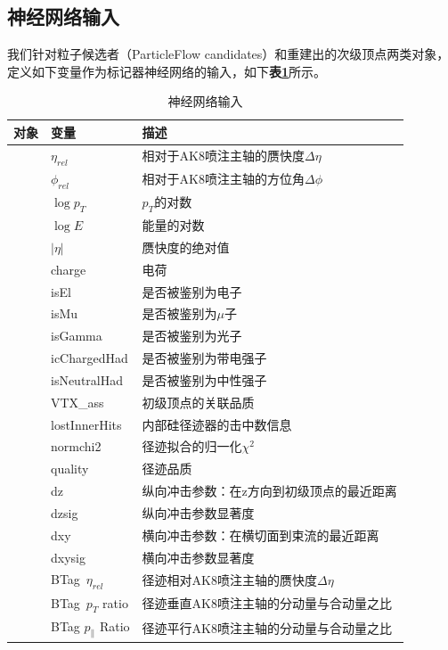 \subsection{神经网络输入}
我们针对粒子候选者（ParticleFlow candidates）和重建出的次级顶点两类对象，定义如下变量作为标记器神经网络的输入，如下\textbf{表\ref{table:5.1}}所示。
\begin{table}[htbp]
    \caption{神经网络输入}\label{table:5.1}
    \centering
    \begin{tabular}{>{\centering\arraybackslash}p{2.5cm}%
    >{\centering\arraybackslash}p{3cm}%
    >{\centering\arraybackslash}p{9cm}}
    \toprule\toprule
    \textbf{对象} & \textbf{变量} & \textbf{描述}\\
    \midrule
    \multirow{25}{*}{粒子候选者} & $\eta_{rel}$ & 相对于AK8喷注主轴的赝快度$\Delta \eta$\\
    & $\phi_{rel}$ & 相对于AK8喷注主轴的方位角$\Delta \phi$\\
    & $\log{p_T}$ & $p_T$的对数\\
    & $\log{E}$ & 能量的对数\\
    & $|\eta|$ & 赝快度的绝对值\\
    & charge & 电荷\\
    & isEl & 是否被鉴别为电子\\
    & isMu & 是否被鉴别为$\mu$子\\
    & isGamma & 是否被鉴别为光子\\
    & icChargedHad & 是否被鉴别为带电强子\\
    & isNeutralHad & 是否被鉴别为中性强子\\
    & VTX\_ass & 初级顶点的关联品质\\
    & lostInnerHits & 内部硅径迹器的击中数信息\\
    & normchi2 & 径迹拟合的归一化$\chi^2$\\
    & quality & 径迹品质\\
    & dz & 纵向冲击参数：在z方向到初级顶点的最近距离\\
    & dzsig & 纵向冲击参数显著度\\
    & dxy & 横向冲击参数：在横切面到束流的最近距离\\
    & dxysig & 横向冲击参数显著度\\
    & BTag\ $\eta_{rel}$ & 径迹相对AK8喷注主轴的赝快度$\Delta \eta$\\
    & BTag\ $p_T$ ratio & 径迹垂直AK8喷注主轴的分动量与合动量之比\\
    & BTag $p_{\parallel}$ Ratio & 径迹平行AK8喷注主轴的分动量与合动量之比\\

\end{tabular}
\end{table}
